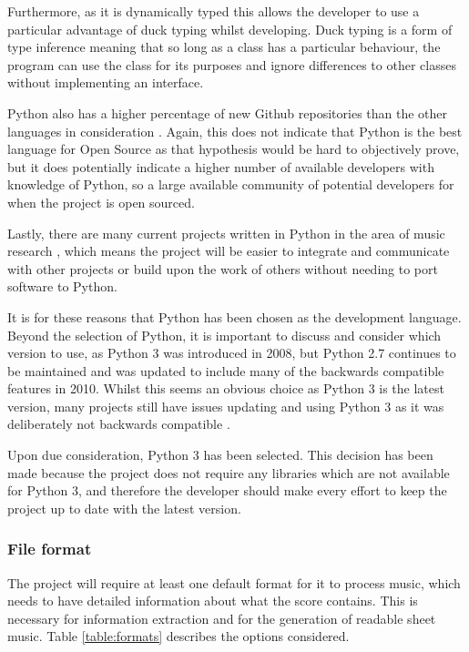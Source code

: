  Furthermore, as it is dynamically typed this allows the developer to use a particular advantage of duck typing whilst developing. Duck typing is a form of type inference 
  meaning that so long as a class has a particular behaviour, the program can use the class for its purposes and ignore differences to other classes without implementing an interface.
 
 Python also has a higher percentage of new Github repositories than the other languages in consideration \parencite{Redmonk}. Again, this does not indicate that Python is the best language for Open Source as that hypothesis would be hard to objectively prove, but it does potentially indicate a higher number of available developers with knowledge of Python, so a large available community of potential developers for when the project is open sourced.
 
 Lastly, there are many current projects written in Python in the area of music research \parencite{pmus}, which means the project will be easier to integrate and communicate with other projects or build upon the work of others without needing to port software to Python.

It is for these reasons that Python has been chosen as the development language. Beyond the selection of Python, it is important to discuss and consider which version to use, as Python 3 was introduced in 2008, but Python 2.7 continues to be maintained and was updated to include many of the backwards compatible features in 2010. Whilst this seems an obvious choice as Python 3 is the latest version, many projects still have issues updating and using Python 3 as it was deliberately not backwards compatible \parencite{Foundation2}.

Upon due consideration, Python 3 has been selected. This decision has been made because the project does not require any libraries which are not available for Python 3, and therefore the developer should make every effort to keep the project up to date with the latest version.

\subsubsection{File format}
The project will require at least one default format for it to process music, which needs to have detailed information about what the score contains. This is necessary for information extraction and for the generation of readable sheet music. Table \ref{table:formats} describes the options considered.

